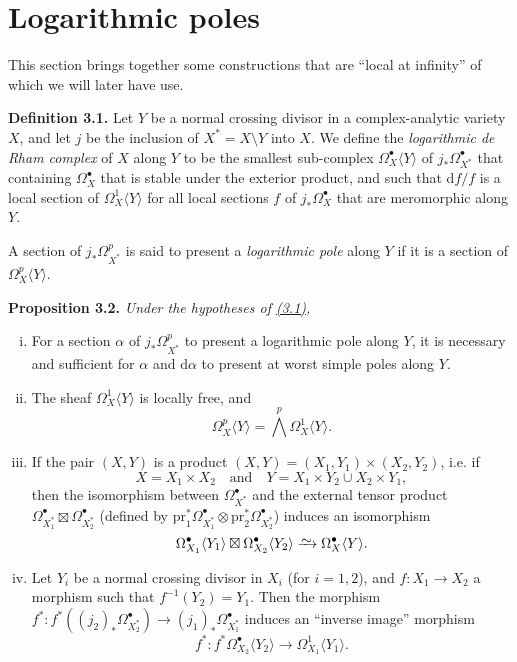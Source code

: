 \documentclass{report}
\newenvironment{itenv}[1]
  {\phantomsection\par\medskip\noindent\textbf{#1.}\itshape}
  {\par\medskip}
\newenvironment{rmenv}[1]
  {\phantomsection\par\medskip\noindent\textbf{#1.}\rmfamily}
  {\par\medskip}
\newcommand{\dd}{\mathrm{d}}
\newcommand{\pr}{\mathrm{pr}}
\newcommand{\simto}{\xrightarrow{\raisebox{-0.7ex}[0ex][0ex]{$\sim$}}}
\newcommand{\oldpage}[1]{\marginpar{\footnotesize$\Big\vert$ \textit{p.~#1}}}
\begin{document}
\section{Logarithmic poles}
\label{II.3}

\oldpage{72}

This section brings together some constructions that are ``local at infinity'' of which we will later have use.

\begin{rmenv}{Definition 3.1}
\label{II.3.1}
  Let $Y$ be a normal crossing divisor in a complex-analytic variety $X$, and let $j$ be the inclusion of $X^*=X\setminus Y$ into $X$.
  We define the \emph{logarithmic de Rham complex} of $X$ along $Y$ to be the smallest sub-complex $\Omega_X^\bullet\langle Y\rangle$ of $j_*\Omega_{X^*}^\bullet$ that containing $\Omega_X^\bullet$ that is stable under the exterior product, and such that $\dd f/f$ is a local section of $\Omega_X^1\langle Y\rangle$ for all local sections $f$ of $j_*\Omega_X^\bullet$ that are meromorphic along $Y$.

  A section of $j_*\Omega_{X^*}^p$ is said to present a \emph{logarithmic pole} along $Y$ if it is a section of $\Omega_X^p\langle Y\rangle$.
\end{rmenv}

\begin{itenv}{Proposition 3.2}
\label{II.3.2}
  Under the hypotheses of \hyperref[II.3.1]{(3.1)},
  \begin{enumerate}[(i)]
    \item For a section $\alpha$ of $j_*\Omega_{X^*}^p$ to present a logarithmic pole along $Y$, it is necessary and sufficient for $\alpha$ and $\dd\alpha$ to present at worst simple poles along $Y$.
    \item The sheaf $\Omega_X^1\langle Y\rangle$ is locally free, and
      \[
        \Omega_X^p\langle Y\rangle = \bigwedge^p \Omega_X^1\langle Y\rangle.
      \]
    \item If the pair $(X,Y)$ is a product $(X,Y)=(X_1,Y_1)\times(X_2,Y_2)$, i.e. if
      \[
        X = X_1\times X_2
        \quad\mbox{and}\quad
        Y = X_1\times Y_2 \cup X_2\times Y_1,
      \]
      then the isomorphism between $\Omega_{X^*}^\bullet$ and the external tensor product $\Omega_{X_1^*}^\bullet\boxtimes\Omega_{X_2^*}^\bullet$ (defined by $\pr_1^*\Omega_{X_1^*}^\bullet\otimes\pr_2^*\Omega_{X_2^*}^\bullet$) induces an isomorphism
      \[
        \Omega_{X_1}^\bullet\langle Y_1\rangle \boxtimes \Omega_{X_2}^\bullet\langle Y_2\rangle
        \simto \Omega_X^\bullet\langle Y\rangle.
      \]
    \item Let $Y_i$ be a normal crossing divisor in $X_i$ (for $i=1,2$), and $f\colon X_1\to X_2$ a morphism such that $f^{-1}(Y_2)=Y_1$.
      Then the morphism $f^*\colon f^*((j_2)_*\Omega_{X_2^*}^\bullet)\to (j_1)_*\Omega_{X_1^*}^\bullet$ induces an ``inverse image'' morphism
      \[
        f^*\colon f^*\Omega_{X_2}^\bullet\langle Y_2\rangle \to \Omega_{X_1}^1\langle Y_1\rangle.
      \]
  \end{enumerate}
\end{itenv}
\end{document}
